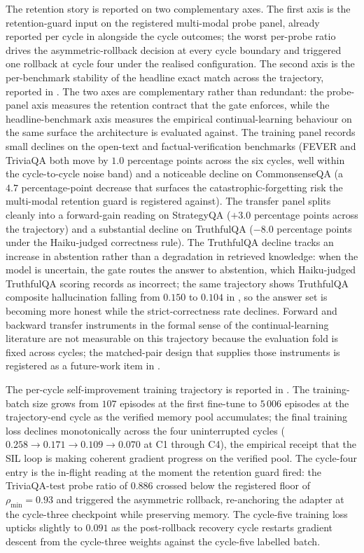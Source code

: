 The retention story is reported on two complementary axes. The first axis is the retention-guard input on the registered multi-modal probe panel, already reported per cycle in  alongside the cycle outcomes; the worst per-probe ratio drives the asymmetric-rollback decision at every cycle boundary and triggered one rollback at cycle four under the realised configuration. The second axis is the per-benchmark stability of the headline exact match across the trajectory, reported in . The two axes are complementary rather than redundant: the probe-panel axis measures the retention contract that the gate enforces, while the headline-benchmark axis measures the empirical continual-learning behaviour on the same surface the architecture is evaluated against. The training panel records small declines on the open-text and factual-verification benchmarks (FEVER and TriviaQA both move by $1.0$ percentage points across the six cycles, well within the cycle-to-cycle noise band) and a noticeable decline on CommonsenseQA (a $4.7$ percentage-point decrease that surfaces the catastrophic-forgetting risk the multi-modal retention guard is registered against). The transfer panel splits cleanly into a forward-gain reading on StrategyQA ($+3.0$ percentage points across the trajectory) and a substantial decline on TruthfulQA ($-8.0$ percentage points under the Haiku-judged correctness rule). The TruthfulQA decline tracks an increase in abstention rather than a degradation in retrieved knowledge: when the model is uncertain, the gate routes the answer to abstention, which Haiku-judged TruthfulQA scoring records as incorrect; the same trajectory shows TruthfulQA composite hallucination falling from $0.150$ to $0.104$ in , so the answer set is becoming more honest while the strict-correctness rate declines. Forward and backward transfer instruments in the formal sense of the continual-learning literature are not measurable on this trajectory because the evaluation fold is fixed across cycles; the matched-pair design that supplies those instruments is registered as a future-work item in .



The per-cycle self-improvement training trajectory is reported in . The training-batch size grows from $107$ episodes at the first fine-tune to $5\,006$ episodes at the trajectory-end cycle as the verified memory pool accumulates; the final training loss declines monotonically across the four uninterrupted cycles ($0.258 \to 0.171 \to 0.109 \to 0.070$ at C1 through C4), the empirical receipt that the SIL loop is making coherent gradient progress on the verified pool. The cycle-four entry is the in-flight reading at the moment the retention guard fired: the TriviaQA-test probe ratio of $0.886$ crossed below the registered floor of $\rho_{\min} = 0.93$ and triggered the asymmetric rollback, re-anchoring the adapter at the cycle-three checkpoint while preserving memory. The cycle-five training loss upticks slightly to $0.091$ as the post-rollback recovery cycle restarts gradient descent from the cycle-three weights against the cycle-five labelled batch.

